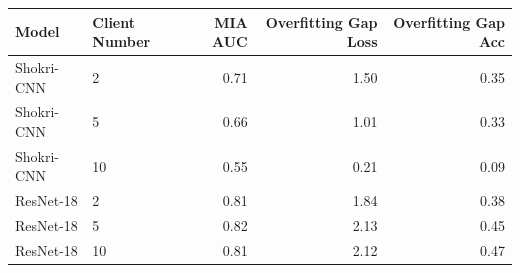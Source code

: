 \begin{tabular}{llrrr}
\toprule
Model & Client Number & MIA AUC & Overfitting Gap Loss & Overfitting Gap Acc \\
\midrule
Shokri-CNN & 2 & 0.71 & 1.50 & 0.35 \\
Shokri-CNN & 5 & 0.66 & 1.01 & 0.33 \\
Shokri-CNN & 10 & 0.55 & 0.21 & 0.09 \\
ResNet-18 & 2 & 0.81 & 1.84 & 0.38 \\
ResNet-18 & 5 & 0.82 & 2.13 & 0.45 \\
ResNet-18 & 10 & 0.81 & 2.12 & 0.47 \\
\bottomrule
\end{tabular}
